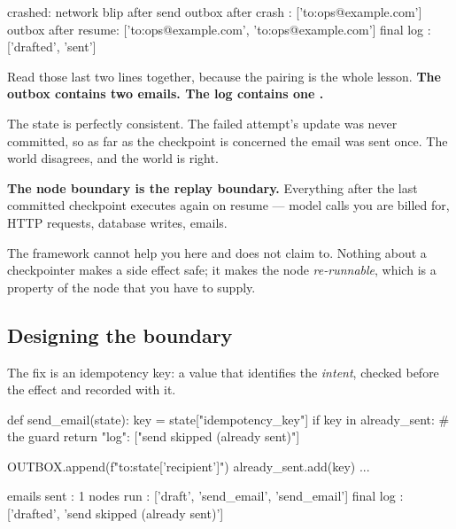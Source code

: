 \begin{console}
crashed: network blip after send
outbox after crash : ['to:ops@example.com']
outbox after resume: ['to:ops@example.com', 'to:ops@example.com']
final log          : ['drafted', 'sent']
\end{console}

Read those last two lines together, because the pairing is the whole lesson.
\textbf{The outbox contains two emails. The log contains one .}

The state is perfectly consistent. The failed attempt's update was never
committed, so as far as the checkpoint is concerned the email was sent once. The
world disagrees, and the world is right.


\begin{warning}
\textbf{The node boundary is the replay boundary.} Everything after the last
committed checkpoint executes again on resume --- model calls you are billed for,
HTTP requests, database writes, emails.

The framework cannot help you here and does not claim to. Nothing about a
checkpointer makes a side effect safe; it makes the node \emph{re-runnable},
which is a property of the node that you have to supply.
\end{warning}

\subsection{Designing the boundary}
\label{sec:idempotency}

The fix is an idempotency key: a value that identifies the \emph{intent}, checked
before the effect and recorded with it.

\begin{python}[caption={The same graph, made safe}, label={lst:idempotent}]
def send_email(state):
    key = state["idempotency_key"]
    if key in already_sent:                  # the guard
        return {"log": ["send skipped (already sent)"]}

    OUTBOX.append(f"to:{state['recipient']}")
    already_sent.add(key)
    ...
\end{python}

\begin{console}
emails sent : 1
nodes run   : ['draft', 'send_email', 'send_email']
final log   : ['drafted', 'send skipped (already sent)']
\end{console}


